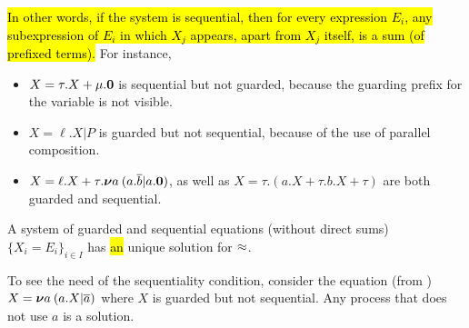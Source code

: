 \hl{In other words,
 if the system is sequential, then  for
 every expression $E_i$, any subexpression of $E_i$ in which $X_j $ 
 appears, apart from $X_j$ itself,  is a sum (of prefixed terms).}
 For instance, 
 \begin{itemize}
 \item $X = \tau. X + \mu . {\boldsymbol 0}$ is sequential but not 
  guarded, because the guarding prefix for the variable is not visible.

 \item $X =  \ell . X | P$ is guarded but not sequential, because of
   the use of parallel composition.

 \item $X =  \ell . X + \tau. {\boldsymbol \nu} a\: (a .\overline{b} | a.{\boldsymbol 0})$, as well as 
 $X = \tau . (a. X + \tau . b .X + \tau  )$
are both guarded and sequential.
\end{itemize}

\begin{theorem}
\label{t:Mil89}
A system of guarded and sequential equations (without direct sums)
$\{  X_i = E_i\}_{i\in I}$ has \hl{an} unique solution for $\approx$.
\end{theorem}

To see the  need of the sequentiality  condition, consider
 the equation (from \cite{Mil89}) $X = {\boldsymbol \nu} a\: (a. X | \overline{a})$
where $X$ is guarded but not sequential. Any process that does not use $a$ is a solution.

